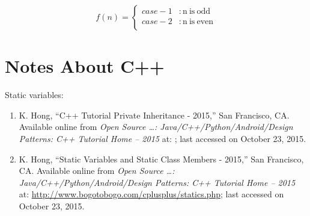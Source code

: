 \begin{equation}
\label{eqn:caseenv}
f(n) = 
	\begin{cases}
	case-1 &: \mathrm{n\ is\ odd} \\
	case-2 &: \mathrm{n\ is\ even} \\
	\end{cases}
\end{equation}




\section{Notes About C++}
\label{sec:NotesAboutCpp}


Static variables: \vspace{-0.3cm}
\begin{enumerate} \itemsep -4pt
\item K. Hong, ``C++ Tutorial
Private Inheritance - 2015,'' San Francisco, CA. Available online from {\it Open Source \dots: Java/C++/Python/Android/Design Patterns: C++ Tutorial Home -- 2015} at: \url{}; last accessed on October 23, 2015.
\item K. Hong, ``Static Variables and Static Class Members - 2015,'' San Francisco, CA. Available online from {\it Open Source \dots: Java/C++/Python/Android/Design Patterns: C++ Tutorial Home -- 2015} at: \url{http://www.bogotobogo.com/cplusplus/statics.php}; last accessed on October 23, 2015.
\end{enumerate}




